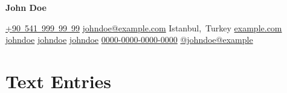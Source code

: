 \documentclass[10pt, letterpaper]{article}
\newenvironment{header}{
    \setlength{\topsep}{0pt}\par\kern\topsep\centering\linespread{1.5}
}{
    \par\kern\topsep
} %
\begin{document}
    \begin{header}
        \fontsize{25 pt}{25 pt}
        \textbf{John Doe}

        \vspace{0.3 cm}

        \normalsize
        \mbox{\href{tel:+905419999999}{\color{black}{\footnotesize\faPhone*}\hspace*{0.13cm}+90 541 999 99 99}}
        \hspace*{0.5 cm}
        \mbox{\href{mailto:johndoe@example.com}{\color{black}{\small\faEnvelope[regular]}\hspace*{0.13cm}johndoe@example.com}}
        \hspace*{0.5 cm}
        \mbox{\color{black}{\small\faMapMarker*}\hspace*{0.13cm}Istanbul, Turkey}
        \hspace*{0.5 cm}
        \mbox{\href{https://example.com/}{\color{black}{\small\faLink}\hspace*{0.13cm}example.com}}
        \hspace*{0.5 cm}
        \mbox{\href{https://linkedin.com/in/johndoe}{\color{black}{\small\faLinkedinIn}\hspace*{0.13cm}johndoe}}
        \hspace*{0.5 cm}
        \mbox{\href{https://github.com/johndoe}{\color{black}{\small\faGithub}\hspace*{0.13cm}johndoe}}
        \hspace*{0.5 cm}
        \mbox{\href{https://instagram.com/johndoe}{\color{black}{\small\faInstagram}\hspace*{0.13cm}johndoe}}
        \hspace*{0.5 cm}
        \mbox{\href{https://orcid.org/0000-0000-0000-0000}{\color{black}{\small\faOrcid}\hspace*{0.13cm}0000-0000-0000-0000}}
        \hspace*{0.5 cm}
        \mbox{\href{https://mastodon.social/@johndoe@example}{\color{black}{\small\faMastodon}\hspace*{0.13cm}@johndoe@example}}
        \hspace*{0.5 cm}
    \end{header}

    \vspace{0.3 cm}


    \section{Text Entries}
\end{document}
